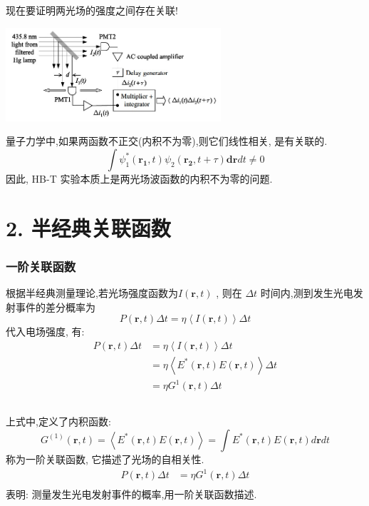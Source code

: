 \begin{frame} 
 \frametitle{}
    现在要证明两光场的强度之间存在关联!   
    \begin{center}
        \includegraphics[width=0.6\textwidth]{figs/2022-05-08-13-20-54.png}
   \end{center}
   量子力学中,如果两函数不正交(内积不为零),则它们线性相关, 是有关联的.
   \[ \int \psi^*_1(\mathbf{r_1},t) \psi_2(\mathbf{r_2},t+ \tau) \mathbf{dr}dt \not = 0 \]
因此, HB-T 实验本质上是两光场波函数的内积不为零的问题.
\end{frame}

\section{2. 半经典关联函数}

 \begin{frame} 
  \frametitle{一阶关联函数}
  根据半经典测量理论,若光场强度函数为$I(\mathbf{r},t)$ , 则在  $ \Delta t $ 时间内,测到发生光电发射事件的差分概率为 
\[  P (\mathbf{r},t) \Delta t = \eta \left\langle I(\mathbf{r},t) \right\rangle \Delta t \]  
代入电场强度, 有:   
\[ \begin{aligned}
    P (\mathbf{r},t) \Delta t &= \eta \left\langle I(\mathbf{r},t) \right\rangle \Delta t \\ 
    & = \eta \left\langle E^* (\mathbf{r},t) E (\mathbf{r},t)\right\rangle \Delta t \\
    &=\eta G^{1} (\mathbf{r},t) \Delta t  \\
\end{aligned}\] 
 \end{frame}

 \begin{frame} 
  \frametitle{}
  上式中,定义了内积函数:
\[ \boxed{ G^{(1)} (\mathbf{r},t) = \left\langle E^* (\mathbf{r},t) E (\mathbf{r},t)\right\rangle} = \int E^* (\mathbf{r},t) E (\mathbf{r},t) d \mathbf{r} dt \]
  称为一阶关联函数, 它描述了光场的自相关性.\\ 
  \[ \begin{aligned}
    P (\mathbf{r},t) \Delta t &=\eta G^{1} (\mathbf{r},t) \Delta t  \\
   \end{aligned}\] 
   表明: 测量发生光电发射事件的概率,用一阶关联函数描述. 
 \end{frame}


